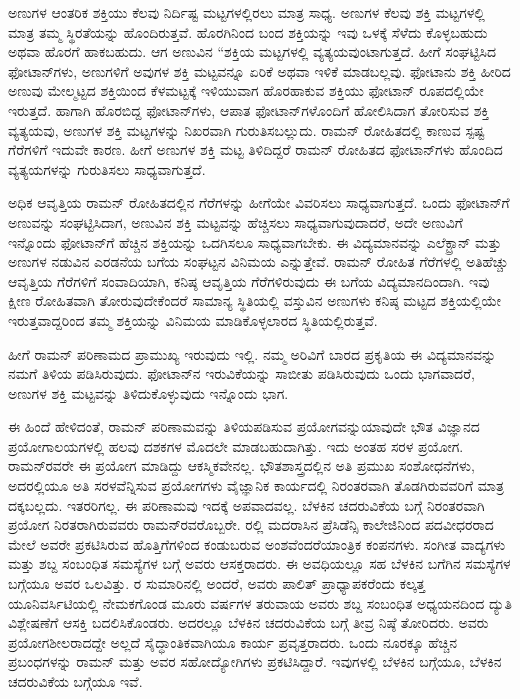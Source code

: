 ಅಣುಗಳ ಆಂತರಿಕ ಶಕ್ತಿಯು ಕೆಲವು ನಿರ್ದಿಷ್ಟ ಮಟ್ಟಗಳಲ್ಲಿರಲು ಮಾತ್ರ ಸಾಧ್ಯ. ಅಣುಗಳ ಕೆಲವು ಶಕ್ತಿ ಮಟ್ಟಗಳಲ್ಲಿ ಮಾತ್ರ ತಮ್ಮ ಸ್ಥಿರತೆಯನ್ನು ಹೊಂದಿರುತ್ತವೆ. ಹೊರಗಿನಿಂದ ಬಂದ ಶಕ್ತಿಯನ್ನು ಇವು ಒಳಕ್ಕೆ ಸೆಳೆದು ಕೊಳ್ಳಬಹುದು ಅಥವಾ ಹೊರಗೆ ಹಾಕಬಹುದು. ಆಗ ಅಣುವಿನ “ಶಕ್ತಿಯ ಮಟ್ಟಗಳಲ್ಲಿ ವ್ಯತ್ಯಯವುಂಟಾಗುತ್ತದೆ. ಹೀಗೆ ಸಂಘಟ್ಟಿಸಿದ ಫೋಟಾನ್‍ಗಳು, ಅಣುಗಳಿಗೆ ಅವುಗಳ ಶಕ್ತಿ ಮಟ್ಟವನ್ನೂ ಏರಿಕೆ ಅಥವಾ ಇಳಿಕೆ ಮಾಡಬಲ್ಲವು. ಫೋಟಾನು ಶಕ್ತಿ ಹೀರಿದ ಅಣುವು ಮೇಲ್ಮಟ್ಟದ ಶಕ್ತಿಯಿಂದ ಕೆಳಮಟ್ಟಕ್ಕೆ ಇಳಿಯುವಾಗ ಹೊರಹಾಕುವ ಶಕ್ತಿಯು ಫೋಟಾನ್ ರೂಪದಲ್ಲಿಯೇ ಇರುತ್ತದೆ. ಹಾಗಾಗಿ ಹೊರಬಿದ್ದ ಫೋಟಾನ್‍ಗಳು, ಆಪಾತ ಫೋಟಾನ್‌ಗಳೊಂದಿಗೆ ಹೋಲಿಸಿದಾಗ ತೋರಿಸುವ ಶಕ್ತಿ ವ್ಯತ್ಯಯವು, ಅಣುಗಳ ಶಕ್ತಿ ಮಟ್ಟಗಳನ್ನು ನಿಖರವಾಗಿ ಗುರುತಿಸಬಲ್ಲುದು. ರಾಮನ್ ರೋಹಿತದಲ್ಲಿ\break {} ಕಾಣುವ ಸ್ಪಷ್ಟ ಗೆರೆಗಳಿಗೆ ಇದುವೇ ಕಾರಣ. ಹೀಗೆ ಅಣುಗಳ ಶಕ್ತಿ ಮಟ್ಟ ತಿಳಿದಿದ್ದರೆ ರಾಮನ್ ರೋಹಿತದ ಫೋಟಾನ್‍ಗಳು ಹೊಂದಿದ ವ್ಯತ್ಯಯಗಳನ್ನು ಗುರುತಿಸಲು ಸಾಧ್ಯವಾಗುತ್ತದೆ.

ಅಧಿಕ ಆವೃತ್ತಿಯ ರಾಮನ್ ರೋಹಿತದಲ್ಲಿನ  ಗೆರೆಗಳನ್ನು ಹೀಗೆಯೇ ವಿವರಿಸಲು ಸಾಧ್ಯವಾಗುತ್ತದೆ. ಒಂದು ಫೋಟಾನ್‍ಗೆ ಅಣುವನ್ನು ಸಂಘಟ್ಟಿಸಿದಾಗ, ಅಣುವಿನ ಶಕ್ತಿ ಮಟ್ಟವನ್ನು ಹೆಚ್ಚಿಸಲು ಸಾಧ್ಯವಾಗುವುದಾದರೆ, ಅದೇ ಅಣುವಿಗೆ ಇನ್ನೊಂದು ಫೋಟಾನ್‍ಗೆ ಹೆಚ್ಚಿನ ಶಕ್ತಿಯನ್ನು ಒದಗಿಸಲೂ ಸಾಧ್ಯವಾಗಬೇಕು. ಈ ವಿದ್ಯಮಾನವನ್ನು ಎಲೆಕ್ಟ್ರಾನ್ ಮತ್ತು ಅಣುಗಳ ನಡುವಿನ ಎರಡನೆಯ ಬಗೆಯ ಸಂಘಟ್ಟನ ವಿನಿಮಯ ಎನ್ನುತ್ತೇವೆ. ರಾಮನ್ ರೋಹಿತ  ಗೆರೆಗಳಲ್ಲಿ ಅತಿಹೆಚ್ಚು ಆವೃತ್ತಿಯ ಗೆರೆಗಳಿಗೆ ಸಂವಾದಿಯಾಗಿ, ಕನಿಷ್ಠ ಆವೃತ್ತಿಯ ಗೆರೆಗಳಿರುವುದು ಈ ಬಗೆಯ ವಿದ್ಯಮಾನದಿಂದಾಗಿ. ಇವು ಕ್ಷೀಣ ರೋಹಿತವಾಗಿ ತೋರುವುದೇಕೆಂದರೆ ಸಾಮಾನ್ಯ ಸ್ಥಿತಿಯಲ್ಲಿ ವಸ್ತುವಿನ ಅಣುಗಳು ಕನಿಷ್ಠ ಮಟ್ಟದ ಶಕ್ತಿಯಲ್ಲಿಯೇ ಇರುತ್ತವಾದ್ದರಿಂದ ತಮ್ಮ ಶಕ್ತಿಯನ್ನು ವಿನಿಮಯ ಮಾಡಿಕೊಳ್ಳಲಾರದ ಸ್ಥಿತಿಯಲ್ಲಿರುತ್ತವೆ.

ಹೀಗೆ ರಾಮನ್ ಪರಿಣಾಮದ ಪ್ರಾಮುಖ್ಯ ಇರುವುದು ಇಲ್ಲಿ. ನಮ್ಮ ಅರಿವಿಗೆ ಬಾರದ ಪ್ರಕೃತಿಯ ಈ ವಿದ್ಯಮಾನವನ್ನು ನಮಗೆ ತಿಳಿಯ ಪಡಿಸಿರುವುದು. ಫೋಟಾನ್‍ನ ಇರುವಿಕೆಯನ್ನು ಸಾಬೀತು ಪಡಿಸಿರುವುದು ಒಂದು ಭಾಗವಾದರೆ, ಅಣುಗಳ ಶಕ್ತಿ ಮಟ್ಟವನ್ನು ತಿಳಿದುಕೊಳ್ಳುವುದು ಇನ್ನೊಂದು ಭಾಗ.

ಈ ಹಿಂದೆ ಹೇಳಿದಂತೆ, ರಾಮನ್ ಪರಿಣಾಮವನ್ನು ತಿಳಿಯಪಡಿಸುವ ಪ್ರಯೋಗವನ್ನು\break ಯಾವುದೇ ಭೌತ ವಿಜ್ಞಾನದ ಪ್ರಯೋಗಾಲಯಗಳಲ್ಲಿ ಹಲವು ದಶಕಗಳ ಮೊದಲೇ ಮಾಡಬಹು\-ದಾಗಿತ್ತು. ಇದು ಅಂತಹ ಸರಳ ಪ್ರಯೋಗ. ರಾಮನ್‍ರವರೇ ಈ ಪ್ರಯೋಗ ಮಾಡಿದ್ದು ಆಕಸ್ಮಿಕವೇನಲ್ಲ. ಭೌತಶಾಸ್ತ್ರದಲ್ಲಿನ ಅತಿ ಪ್ರಮುಖ ಸಂಶೋಧನೆಗಳು, ಅದರಲ್ಲಿಯೂ ಅತಿ ಸರಳವೆನ್ನಿಸುವ ಪ್ರಯೋಗಗಳು ವೈಜ್ಞಾನಿಕ ಕಾರ್ಯದಲ್ಲಿ ನಿರಂತರವಾಗಿ ತೊಡಗಿರುವವರಿಗೆ ಮಾತ್ರ ದಕ್ಕಬಲ್ಲದು. ಇತರರಿಗಲ್ಲ. ಈ ಪರಿಣಾಮವು ಇದಕ್ಕೆ ಅಪವಾದವಲ್ಲ. ಬೆಳಕಿನ ಚದರುವಿಕೆಯ ಬಗ್ಗೆ ನಿರಂತರವಾಗಿ ಪ್ರಯೋಗ ನಿರತರಾಗಿರುವವರು ರಾಮನ್‍ರವರೊಬ್ಬರೇ. ರಲ್ಲಿ ಮದರಾಸಿನ ಪ್ರೆಸಿಡೆನ್ಸಿ ಕಾಲೇಜಿನಿಂದ ಪದವೀಧರರಾದ ಮೇಲೆ ಅವರೇ ಪ್ರಕಟಿಸಿರುವ ಹೊತ್ತಿಗೆಗಳಿಂದ\enginline{--} ಕಂಡು\-ಬರುವ ಅಂಶವೆಂದರೆ\enginline{--}ಯಾಂತ್ರಿಕ ಕಂಪನಗಳು. ಸಂಗೀತ ವಾದ್ಯಗಳು ಮತ್ತು ಶಬ್ದ ಸಂಬಂಧಿತ ಸಮಸ್ಯೆಗಳ ಬಗ್ಗೆ ಅವರು ಆಸಕ್ತರಾದರು. ಈ ಅವಧಿಯಲ್ಲೂ ಸಹ ಬೆಳಕಿನ ಬಗೆಗಿನ ಸಮಸ್ಯೆಗಳ ಬಗ್ಗೆಯೂ ಅವರ ಒಲವಿತ್ತು. ರ ಸುಮಾರಿನಲ್ಲಿ ಅಂದರೆ, ಅವರು ಪಾಲಿತ್ ಪ್ರಾಧ್ಯಾಪಕರೆಂದು ಕಲ್ಕತ್ತ ಯೂನಿವರ್ಸಿಟಿಯಲ್ಲಿ ನೇಮಕಗೊಂಡ ಮೂರು ವರ್ಷಗಳ ತರುವಾಯ ಅವರು ಶಬ್ದ ಸಂಬಂಧಿತ ಅಧ್ಯಯನದಿಂದ ದ್ಯುತಿ ವಿಶ್ಲೇಷಣೆಗೆ ಆಸಕ್ತಿ ಬದಲಿಸಿಕೊಂಡರು. ಅದರಲ್ಲೂ ಬೆಳಕಿನ ಚದರುವಿಕೆಯ ಬಗ್ಗೆ ತೀವ್ರ ನಿಷ್ಠೆ ತೋರಿದರು. ಅವರು ಪ್ರಯೋಗಶೀಲರಾದದ್ದೇ ಅಲ್ಲದೆ ಸೈದ್ಧಾಂತಿಕವಾಗಿಯೂ ಕಾರ್ಯ ಪ್ರವೃತ್ತರಾದರು. ಒಂದು ನೂರಕ್ಕೂ ಹೆಚ್ಚಿನ ಪ್ರಬಂಧಗಳನ್ನು ರಾಮನ್ ಮತ್ತು ಅವರ ಸಹೋದ್ಯೋಗಿಗಳು ಪ್ರಕಟಿಸಿದ್ದಾರೆ. ಇವುಗಳಲ್ಲಿ  ಬೆಳಕಿನ ಬಗ್ಗೆಯೂ,  ಬೆಳಕಿನ ಚದರುವಿಕೆಯ ಬಗ್ಗೆಯೂ ಇವೆ.

